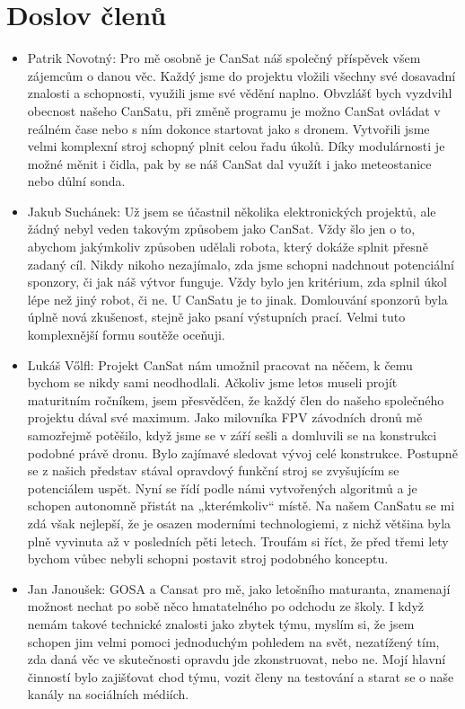\documentclass[a4paper]{report}
\begin{document}
\section{Doslov členů}
\begin{itemize}
\item Patrik Novotný: Pro mě osobně je CanSat náš společný příspěvek všem zájemcům o danou věc. Každý jsme do projektu vložili všechny své dosavadní znalosti a schopnosti, využili jsme své vědění naplno. Obvzlášť bych vyzdvihl obecnost našeho CanSatu, při změně programu je možno CanSat ovládat v reálném čase nebo s ním dokonce startovat jako s dronem. Vytvořili jsme velmi komplexní stroj schopný plnit celou řadu úkolů. Díky modulárnosti je možné měnit i čidla, pak by se náš CanSat dal využít i jako meteostanice nebo důlní sonda.
\item Jakub Suchánek: Už jsem se účastnil několika elektronických projektů, ale žádný nebyl veden takovým způsobem jako CanSat. Vždy šlo jen o to, abychom jakýmkoliv způsoben udělali robota, který dokáže splnit přesně zadaný cíl. Nikdy nikoho nezajímalo, zda jsme schopni nadchnout potenciální sponzory, či jak náš výtvor funguje. Vždy bylo jen kritérium, zda splnil úkol lépe než jiný robot, či ne. U CanSatu je to jinak. Domlouvání sponzorů byla úplně nová zkušenost, stejně jako psaní výstupních prací. Velmi tuto komplexnější formu soutěže oceňuji.
\item Lukáš Vőlfl: Projekt CanSat nám umožnil pracovat na něčem, k čemu bychom se nikdy sami neodhodlali. Ačkoliv jsme letos museli projít maturitním ročníkem, jsem přesvědčen, že každý člen do našeho společného projektu dával své maximum. Jako milovníka FPV závodních dronů mě samozřejmě potěšilo, když jsme se v září sešli a domluvili se na konstrukci podobné právě dronu. Bylo zajímavé sledovat vývoj celé konstrukce. Postupně se z našich představ stával opravdový funkční stroj se zvyšujícím se potenciálem uspět.  Nyní se řídí podle námi vytvořených algoritmů a je schopen autonomně přistát na „kterémkoliv“ místě. Na našem CanSatu se mi zdá však nejlepší, že je osazen moderními technologiemi, z nichž většina byla plně vyvinuta až v posledních pěti letech. Troufám si říct, že před třemi lety bychom vůbec nebyli schopni postavit stroj podobného konceptu. 
\item Jan Janoušek: GOSA a Cansat pro mě, jako letošního maturanta, znamenají možnost nechat po sobě něco hmatatelného po odchodu ze školy. I když nemám takové technické znalosti jako zbytek týmu, myslím si, že jsem schopen jim velmi pomoci jednoduchým pohledem na svět, nezatížený tím, zda daná věc ve skutečnosti opravdu jde zkonstruovat, nebo ne. Mojí hlavní činností bylo zajišťovat chod týmu, vozit členy na testování a starat se o naše kanály na sociálních médiích.

\end{itemize}
\end{document}
